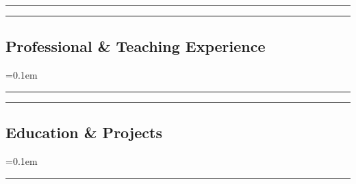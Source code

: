 






\hrule
\begin{indentsection}{\parindent}
\begin{description*}
  
  
\end{description*}
\end{indentsection}


\hrule
\vspace{-0.4em}
\subsection*{Professional \& Teaching Experience}
\begin{itemize}
  \parskip=0.1em

  
  
  
  
  
  
  
\end{itemize}


\vspace*{\fill}


\hrule
\begin{indentsection}{\parindent}
\begin{description*}
  
\end{description*}
\end{indentsection}


\clearpage


\hrule
\vspace{-0.4em}
\subsection*{Education \& Projects}
\begin{itemize}
  \parskip=0.1em

  
  
\end{itemize}
\hrule


\vspace*{\fill}



